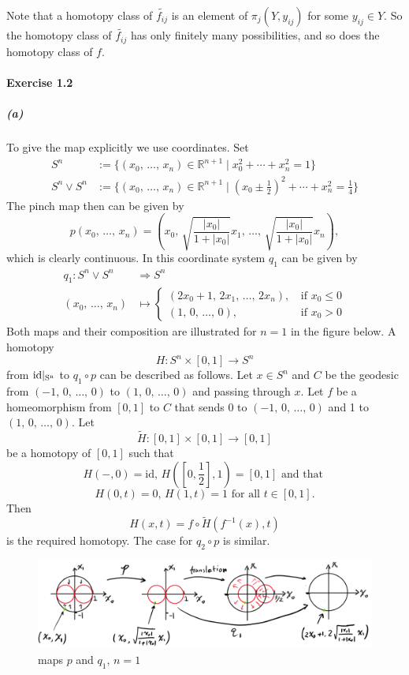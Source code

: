 \documentclass{article}
\begin{document}
Note that a homotopy class of $\widetilde{f_{ij}}$ is an element of $\pi_j(Y,y_{ij})$ for some $y_{ij}\in Y.$ So the homotopy class of $\widetilde{f_{ij}}$ has only finitely many possibilities, and so does the homotopy class of $f$.
\paragraph{Exercise 1.2}
\subparagraph{(a)}To give the map explicitly we use coordinates. Set
\begin{align*}
  S^n & :=\{(x_0,\,\ldots,\,x_n)\in\mathbb{R}^{n+1}\mid x_0^2+\cdots+x_n^2=1\} \\
  S^n\vee S^n & :=\{(x_0,\,\ldots,\,x_n)\in\mathbb{R}^{n+1}\mid (x_0\pm\frac{1}{2})^2+\cdots+x_n^2=\frac{1}{4}\}
\end{align*}
The pinch map then can be given by
\[p(x_0,\,\ldots,\,x_n)=\left(x_0,\,\sqrt{\frac{|x_0|}{1+|x_0|}}x_1,\,\ldots,\,\sqrt{\frac{|x_0|}{1+|x_0|}}x_n\right),\]
which is clearly continuous. In this coordinate system $q_1$ can be given by
\begin{align*}
  q_1\colon S^n\vee S^n & \Rightarrow S^n \\
  (x_0,\,\ldots,\,x_n) & \mapsto
  \begin{cases}
   (2x_0+1,\,2x_1,\,\ldots,\,2x_n),\,&\text{if } x_0\leq0\\
   (1,\,0,\,\ldots,\,0),\,&\text{if }x_0>0
   \end{cases}
\end{align*}
Both maps and their composition are illustrated for $n=1$ in the figure below. A homotopy
\[H\colon S^n\times[0,1]\rightarrow S^n\]
from $\rm{id}|_{S^n}$ to $q_1\circ p$ can be described as follows. Let $x\in S^n$ and $C$ be the geodesic from $(-1,\,0,\,\ldots,\,0)$ to $(1,\,0,\,\ldots,\,0)$ and passing through $x.$ Let $f$ be a homeomorphism from $[0,1]$ to $C$ that sends $0$ to $(-1,\,0,\,\ldots,\,0)$ and 1 to $(1,\,0,\,\ldots,\,0).$ Let
\[\tilde{H}\colon [0,1]\times[0,1]\rightarrow[0,1]\]
be a homotopy of $[0,1]$ such that 
\[H(-,0)=\mathrm{id},\,H([0,\frac{1}{2}],1)=[0,1] \text{ and that }\]
\[H(0,t)=0,\,H(1,t)=1\text{ for all }t\in[0,1].\]
Then
\[H(x,t)=f\circ\tilde{H}(f^{-1}(x),t)\]
is the required homotopy. The case for $q_2\circ p$ is similar.
\begin{figure}[ht]
  \centering
  \includegraphics[width=15cm]{ES1_1.png}
  \caption{maps $p$ and $q_1,\,n=1$}
\end{figure}
\end{document}
